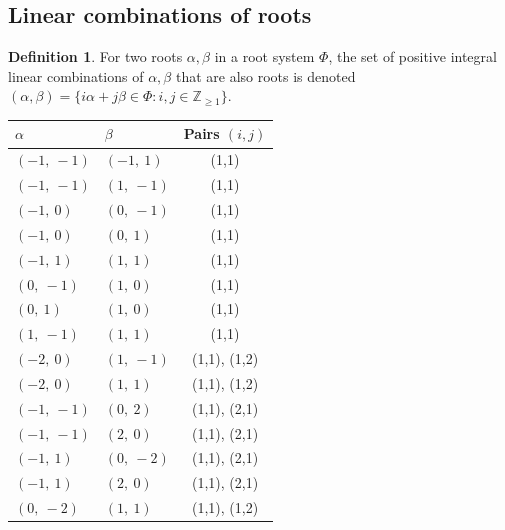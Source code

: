\documentclass[11pt]{article}
\newcommand{\noi}{\noindent}
\theoremstyle{definition}
\newtheorem{definition}{Definition}[section]
\newif\ifsummablepairs
\begin{document}
\ifsummablepairs
\subsection{Linear combinations of roots}

\begin{definition}
For two roots $\alpha, \beta$ in a root system $\Phi$, the set of positive integral linear combinations of $\alpha, \beta$ that are also roots is denoted
\(
	(\alpha, \beta) = \{ i \alpha + j \beta \in \Phi : i, j \in \mathbb{Z}_{\ge 1} \}
\).
\end{definition}
\noi \noindent \begin{longtable}{|l|l|c|}
    \hline
    $\alpha$ & $\beta$ & Pairs $(i,j)$ \\
    \hline
    \endhead
    $\left( -1, \  -1\right)$ & $\left( -1, \  1\right)$ & (1,1) \\
    \hline
    $\left( -1, \  -1\right)$ & $\left( 1, \  -1\right)$ & (1,1) \\
    \hline
    $\left( -1, \  0\right)$ & $\left( 0, \  -1\right)$ & (1,1) \\
    \hline
    $\left( -1, \  0\right)$ & $\left( 0, \  1\right)$ & (1,1) \\
    \hline
    $\left( -1, \  1\right)$ & $\left( 1, \  1\right)$ & (1,1) \\
    \hline
    $\left( 0, \  -1\right)$ & $\left( 1, \  0\right)$ & (1,1) \\
    \hline
    $\left( 0, \  1\right)$ & $\left( 1, \  0\right)$ & (1,1) \\
    \hline
    $\left( 1, \  -1\right)$ & $\left( 1, \  1\right)$ & (1,1) \\
    \hline
    $\left( -2, \  0\right)$ & $\left( 1, \  -1\right)$ & (1,1), (1,2) \\
    \hline
    $\left( -2, \  0\right)$ & $\left( 1, \  1\right)$ & (1,1), (1,2) \\
    \hline
    $\left( -1, \  -1\right)$ & $\left( 0, \  2\right)$ & (1,1), (2,1) \\
    \hline
    $\left( -1, \  -1\right)$ & $\left( 2, \  0\right)$ & (1,1), (2,1) \\
    \hline
    $\left( -1, \  1\right)$ & $\left( 0, \  -2\right)$ & (1,1), (2,1) \\
    \hline
    $\left( -1, \  1\right)$ & $\left( 2, \  0\right)$ & (1,1), (2,1) \\
    \hline
    $\left( 0, \  -2\right)$ & $\left( 1, \  1\right)$ & (1,1), (1,2) \\

\end{longtable}
\end{document}
